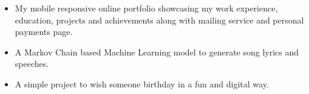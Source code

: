 \documentclass[10pt,a4paper,ragged2e]{altacv}
\begin{document}
\begin{itemize}
\item My mobile responsive online portfolio showcasing my work experience, education, projects and achievements along with mailing service and personal payments page. 
\end{itemize}

\begin{itemize}
\item A Markov Chain based Machine Learning model to generate song lyrics and speeches. 
\end{itemize}


\begin{itemize}
\item  A simple project to wish someone birthday in a fun and digital way.
\end{itemize}




\end{document}
